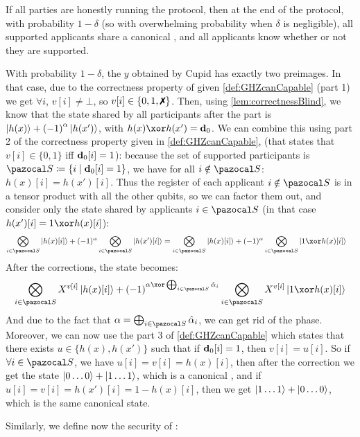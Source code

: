 \begin{lemmaE}
  If all parties are honestly running the \blindCanSup{} protocol, then at the end of the protocol, with probability $1-\delta$ (so with overwhelming probability when $\delta$ is negligible), all supported applicants share a canonical \GHZ{}, and all applicants know whether or not they are supported.
\end{lemmaE}
\begin{proofE}
  With probability $1-\delta$, the $y$ obtained by Cupid has exactly two preimages. In that case, due to the correctness property of \partialInfo{} given \cref{def:GHZcanCapable} (part 1) we get $\forall i$, $v[i] \neq \bot$, so $v[i] \in \{0,1,\cross\}$. Then, using \cref{lem:correctnessBlind}, we know that the state shared by all participants after the \blind{} part is $\ket{h(x)}+{(-1)}^\alpha\ket{h(x')}$, with $h(x) \xor h(x') = \vect{d}_0$. We can combine this using part 2 of the correctness property given in \cref{def:GHZcanCapable}, (that states that $v[i] \in \{0,1\}$ iff $\mathbf{d}_0[i] = 1$): because the set of supported participants is $\cS \eqdef \{i \mid \vect{d}_0[i] = 1\}$, we have for all $i \notin \cS$: $h(x)[i] = h(x')[i]$. Thus the register of each applicant $i \notin \cS$ is in a tensor product with all the other qubits, so we can factor them out, and consider only the state shared by applicants $i \in \cS$ (in that case $h(x')[i] = 1 \xor h(x)[i]$):
  \begin{align}
    \bigotimes_{i \in \cS} \ket{h(x)[i]} + (-1)^\alpha\bigotimes_{i \in \cS} \ket{h(x')[i]}
    &= \bigotimes_{i \in \cS} \ket{h(x)[i]} + (-1)^\alpha\bigotimes_{i \in \cS} \ket{1 \xor h(x)[i]}
  \end{align}
  After the corrections, the state becomes:
  \begin{align}
    \bigotimes_{i \in \cS} X^{v[i]}\ket{h(x)[i]} + (-1)^{\alpha \xor \bigoplus_{i \in \cS} \hat{\alpha}_i}\bigotimes_{i \in \cS} X^{v[i]}\ket{1 \xor h(x)[i]}
  \end{align}
  And due to the fact that $\alpha = \bigoplus_{i \in \cS} \hat{\alpha}_i$, we can get rid of the phase. Moreover, we can now use the part 3 of \cref{def:GHZcanCapable} which states that there exists $u \in \{h(x),h(x')\}$ such that if $\mathbf{d}_0[i] = 1$, then $v[i] = u[i]$. So if $\forall i \in \cS$, we have $u[i] = v[i] = h(x)[i]$, then after the correction we get the state $\ket{0 \dots 0}+\ket{1 \dots 1}$, which is a canonical \GHZ{}, and if $u[i] = v[i] = h(x')[i] = 1-h(x)[i]$, then we get $\ket{1 \dots 1} + \ket{0 \dots 0}$, which is the same canonical \GHZ{} state.
\end{proofE}
Similarly, we define now the security of \blindCanSup{}:

